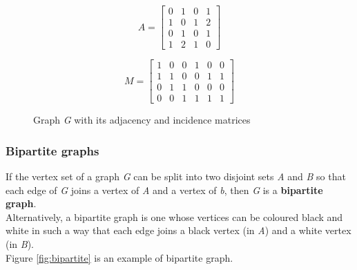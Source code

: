 \begin{figure}[H]
    \centering
    \begin{minipage}{0.5\textwidth}
        \centering
    \end{minipage}%
    \begin{minipage}{0.5\textwidth}
        \[
        A = \begin{bmatrix}
        0 & 1 & 0 & 1 \\
        1 & 0 & 1 & 2 \\
        0 & 1 & 0 & 1 \\
        1 & 2 & 1 & 0
        \end{bmatrix}
        \]
        
        \[
        M = \begin{bmatrix}
        1 & 0 & 0 & 1 & 0 & 0 \\
        1 & 1 & 0 & 0 & 1 & 1 \\
        0 & 1 & 1 & 0 & 0 & 0 \\
        0 & 0 & 1 & 1 & 1 & 1
        \end{bmatrix}
        \]
    \end{minipage}
    \caption{Graph \textit{G} with its adjacency and incidence matrices}
    \label{fig:matrix_representations}
\end{figure}


\subsubsection{Bipartite graphs}
If the vertex set of a graph \textit{G} can be split into two disjoint sets \textit{A} and \textit{B} so that each
edge of \textit{G} joins a vertex of \textit{A} and a vertex of \textit{b}, then \textit{G} is a \textbf{bipartite graph}. \\
Alternatively, a bipartite graph is one whose vertices can be coloured black and white in such a way that each edge joins a black vertex (in \textit{A}) and a white vertex (in \textit{B}). \\
Figure \ref{fig:bipartite} is an example of bipartite graph.

